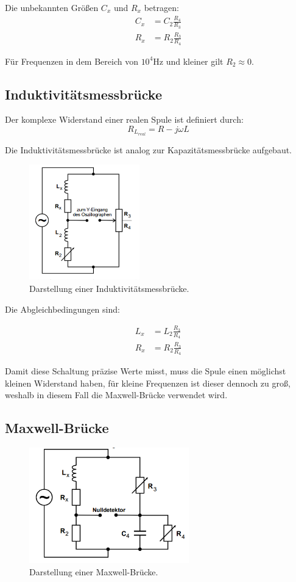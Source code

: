 Die unbekannten Größen $C_x$ und $R_x$ betragen:
\begin{align}
  C_x &= C_2 \frac{R_4}{R_3} \\
  R_x &= R_2 \frac{R_3}{R_4}
\end{align}

Für Frequenzen in dem Bereich von $10^4$Hz und kleiner gilt $R_2 \approx 0$.


\subsection{Induktivitätsmessbrücke}
Der komplexe Widerstand einer realen Spule ist definiert durch:
\begin{equation}
  R_{L_{real}} = R - j \omega L
\end{equation}

Die Induktivitätsmessbrücke ist analog zur Kapazitätsmessbrücke aufgebaut.

\begin{figure}[H]
  \centering
  \includegraphics[height=5cm]{induktivitaet.PNG}
  \caption{Darstellung einer Induktivitätsmessbrücke. \cite{sample}}
  \label{fig:induktivitaet}
\end{figure}

Die Abgleichbedingungen sind:

\begin{align}
  L_x &= L_2 \frac{R_3}{R_4} \\
  R_x &= R_2 \frac{R_3}{R_4}
\end{align}

Damit diese Schaltung präzise Werte misst, muss die Spule einen möglichst kleinen Widerstand haben, für kleine Frequenzen
ist dieser dennoch zu groß, weshalb in diesem Fall die Maxwell-Brücke verwendet wird.

\subsection{Maxwell-Brücke}

\begin{figure}[H]
  \centering
  \includegraphics[height=5cm]{maxwell.PNG}
  \caption{Darstellung einer Maxwell-Brücke. \cite{sample}}
  \label{fig:maxwell}
\end{figure}

